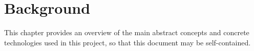 
\chapter{Background}
\label{chapter:background}

This chapter provides an overview of the main abstract concepts and concrete
technologies used in this project, so that this document may be self-contained.


